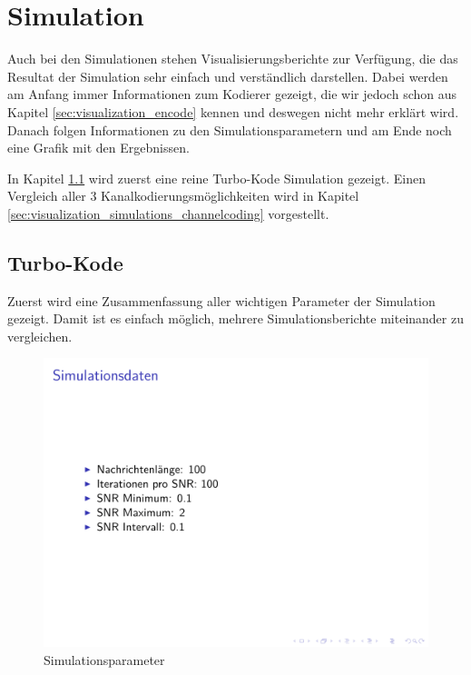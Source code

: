 \section{Simulation}
\label{sec:visualization_simulation}
Auch bei den Simulationen stehen Visualisierungsberichte zur Verfügung, die das Resultat der Simulation sehr einfach und verständlich darstellen. Dabei werden am Anfang immer Informationen zum Kodierer gezeigt, die wir jedoch schon aus Kapitel \ref{sec:visualization_encode} kennen und deswegen nicht mehr erklärt wird. Danach folgen Informationen zu den Simulationsparametern und am Ende noch eine Grafik mit den Ergebnissen.

In Kapitel \ref{sec:visualization_simulations_turbo} wird zuerst eine reine Turbo-Kode Simulation gezeigt. Einen Vergleich aller 3 Kanalkodierungsmöglichkeiten wird in Kapitel \ref{sec:visualization_simulations_channelcoding} vorgestellt.

\subsection{Turbo-Kode}
\label{sec:visualization_simulations_turbo}
Zuerst wird eine Zusammenfassung aller wichtigen Parameter der Simulation gezeigt. Damit ist es einfach möglich, mehrere Simulationsberichte miteinander zu vergleichen.

\begin{figure}[!ht]
\centering
\includegraphics[width=\ScaleIfNeeded]{pictures/SimulationTurbo1}
\caption{Simulationsparameter}
\label{pic:TurboSimulationParameter}
\end{figure}

